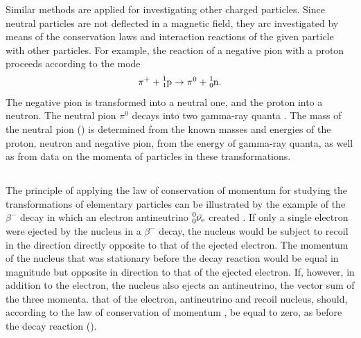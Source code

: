 Similar methods are applied for investigating other charged
particles. Since neutral particles are not deflected in a magnetic field, they arc investigated by means of the conservation laws and interaction reactions of the given particle with other particles. For example, the reaction of a negative pion with a proton proceeds according to the mode
\begin{equation*}%
\pi^{+} + \ce{^{1}_{1}p} \to \pi^{0} + \ce{^{1}_{0}n}.
\end{equation*}
The negative pion is transformed into a neutral one, and the
proton into a neutron. The neutral pion $\pi^{0}$ decays into two gamma-ray quanta . The mass of the neutral pion () is determined from the known masses and energies of the proton, neutron and negative pion, from the energy of gamma-ray quanta, as well as from data on the momenta of particles in these transformations.

\subsection{}\label{43.3.6} The principle of applying the law of conservation of momentum for studying the transformations of elementary particles can be illustrated by the example of the $\beta^{-}$ decay in which an electron antineutrino $\ce{^{0}_{0}\tilde{\nu_{e}}}$  created . If only a single electron were ejected by the nucleus in a $\beta^{-}$ decay, the nucleus would be subject to recoil in the direction directly opposite to that of the ejected electron. The momentum of the nucleus that was stationary before the decay reaction would be equal in magnitude but opposite in direction to that of the ejected electron. If, however, in addition to the electron, the nucleus also ejects an antineutrino, the vector sum of the three momenta. that of the electron, antineutrino and recoil nucleus, should, according to the law of conservation of momentum , be equal to zero, as before the decay reaction ().


